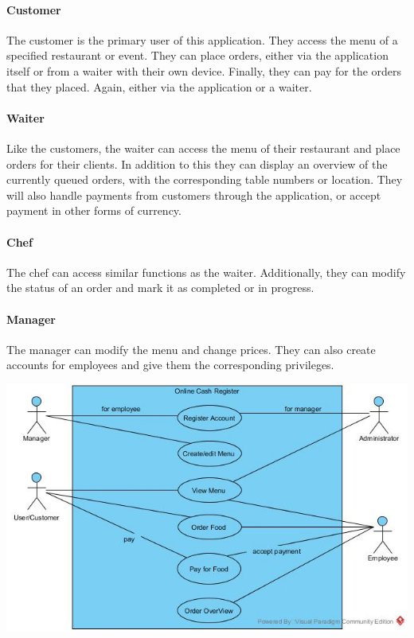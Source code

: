 \documentclass[12pt]{article}
\newenvironment{Figure}
	{\par\medskip\noindent\minipage{\linewidth}}
	{\endminipage\par\medskip}
\begin{document}
\begin{multicols}{2}
\paragraph{Customer}
The customer is the primary user of this application. They access the menu of a specified restaurant or event. They can place orders, either via the application itself or from a waiter with their own device. Finally, they can pay for the orders that they placed. Again, either via the application or a waiter.
\paragraph{Waiter}
Like the customers, the waiter can access the menu of their restaurant and place orders for their clients. In addition to this they can display an overview of the currently queued orders, with the corresponding table numbers or location. They will also handle payments from customers through the application, or accept payment in other forms of currency.
\paragraph{Chef}
The chef can access similar functions as the waiter. Additionally, they can modify the status of an order and mark it as completed or in progress.
\paragraph{Manager}
The manager can modify the menu and change prices. They can also create accounts for employees and give them the corresponding privileges.\\

\begin{Figure}
	\centering
	\includegraphics[width=\linewidth]{illustrations/usecase.jpg}
	\label{fig:usecase}
\end{Figure}


\end{multicols}
\end{document}
